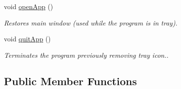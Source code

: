 \begin{DoxyCompactItemize}
void \hyperlink{classmain_win_acb51cccbafc4c963ef55ef6d517c60c7}{open\-App} ()
\begin{DoxyCompactList}\small\item\em Restores main window (used while the program is in tray). \end{DoxyCompactList}\item 
void \hyperlink{classmain_win_abacc60b864c8156cbeb235b516a3be05}{quit\-App} ()
\begin{DoxyCompactList}\small\item\em Terminates the program previously removing tray icon.. \end{DoxyCompactList}\end{DoxyCompactItemize}
\subsection*{Public Member Functions}
